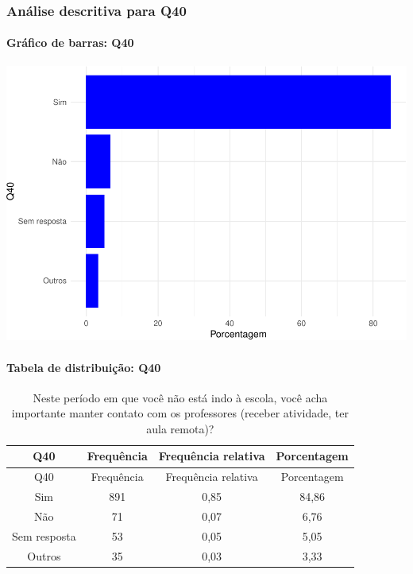 \documentclass[]{article}
\let\oldparagraph\paragraph
\renewcommand{\paragraph}[1]{\oldparagraph{#1}\mbox{}}
\begin{document}
\hypertarget{anuxe1lise-descritiva-para-q40}{%
\subsubsection{Análise descritiva para Q40}\label{anuxe1lise-descritiva-para-q40}}

\hypertarget{gruxe1fico-de-barras-q40}{%
\paragraph{Gráfico de barras: Q40}\label{gruxe1fico-de-barras-q40}}

\begin{center}\includegraphics[width=0.75\linewidth]{relatorio_covid19_files/figure-latex/unnamed-chunk-1543-1} \end{center}

\hypertarget{tabela-de-distribuiuxe7uxe3o-q40}{%
\paragraph{Tabela de distribuição: Q40}\label{tabela-de-distribuiuxe7uxe3o-q40}}

\begin{longtable}[]{@{}cccc@{}}
\caption{\label{tab:unnamed-chunk-1544}Neste período em que você não está indo à escola, você acha importante manter contato com os professores (receber atividade, ter aula remota)?}\tabularnewline
\toprule
Q40 & Frequência & Frequência relativa & Porcentagem\tabularnewline
\midrule
\endfirsthead
\toprule
Q40 & Frequência & Frequência relativa & Porcentagem\tabularnewline
\midrule
\endhead
Sim & 891 & 0,85 & 84,86\tabularnewline
Não & 71 & 0,07 & 6,76\tabularnewline
Sem resposta & 53 & 0,05 & 5,05\tabularnewline
Outros & 35 & 0,03 & 3,33\tabularnewline
\bottomrule
\end{longtable}
\end{document}
